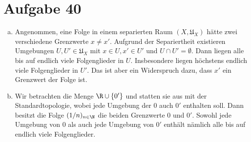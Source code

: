 \documentclass{article}
\begin{document}
  \section*{Aufgabe 40}
  \begin{enumerate}[(a)]
    \item Angenommen, eine Folge in einem separierten Raum $(X, \mathfrak{U}_X)$ hätte zwei verschiedene Grenzwerte $x \neq x'$. 
    Aufgrund der Separiertheit existieren Umgebungen $U, U' \in \mathfrak{U}_X$ mit $x \in U, x'\in U'$ und $U \cap U' = \emptyset$.
    Dann liegen alle bis auf endlich viele Folgenglieder in $U$. Insbesondere liegen höchstens endlich viele Folgenglieder in $U'$.
    Das ist aber ein Widerspruch dazu, dass $x'$ ein Grenzwert der Folge ist.
    \item Wir betrachten die Menge $\R \cup \{0'\}$ und 
    statten sie aus mit der Standardtopologie, wobei jede Umgebung der $0$ auch $0'$ enthalten soll.
    Dann besitzt die Folge $(1/n)_{n\in \N}$ die beiden Grenzwerte $0$ und $0'$. 
    Sowohl jede Umgebung von $0$ als auch jede Umgebung von $0'$ enthält nämlich alle bis auf endlich viele Folgenglieder. 
  \end{enumerate}
\end{document}
